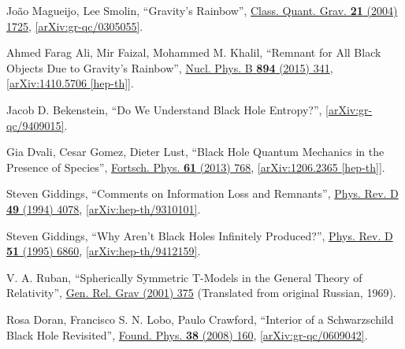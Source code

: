 \documentclass[12pt,preprintnumbers, floatfix, preprintnumbers, letterpaper, superscriptaddress,nofootinbib]{revtex4-2}
\begin{document}
\begin{thebibliography}{99}
Jo\~{a}o Magueijo, Lee Smolin, ``Gravity's Rainbow'', {\hypersetup{urlcolor=vividviolet}\href{https://iopscience.iop.org/article/10.1088/0264-9381/21/7/001}{Class. Quant. Grav. \textbf{21} (2004) 1725}}, \href{https://arxiv.org/abs/gr-qc/0305055}{[arXiv:gr-qc/0305055]}.

Ahmed Farag Ali, Mir Faizal, Mohammed M. Khalil, ``Remnant for All Black Objects Due to Gravity's Rainbow'', {\hypersetup{urlcolor=vividviolet}\href{https://www.sciencedirect.com/science/article/pii/S0550321315000966?via\%3Dihub}{Nucl. Phys. B \textbf{894} (2015) 341}}, \href{https://arxiv.org/abs/1410.5706}{[arXiv:1410.5706 [hep-th]]}.


Jacob D. Bekenstein, ``Do We Understand Black Hole Entropy?'', \href{https://arxiv.org/abs/gr-qc/9409015}{[arXiv:gr-qc/9409015]}.

Gia Dvali, Cesar Gomez, Dieter Lust, ``Black Hole Quantum Mechanics in the Presence of Species'', {\hypersetup{urlcolor=vividviolet}\href{https://onlinelibrary.wiley.com/doi/10.1002/prop.201300002}{Fortsch. Phys. \textbf{61} (2013) 768}}, \href{https://arxiv.org/abs/1206.2365}{[arXiv:1206.2365 [hep-th]]}.

Steven Giddings, ``Comments on Information Loss and Remnants'', {\hypersetup{urlcolor=vividviolet}\href{https://journals.aps.org/prd/abstract/10.1103/PhysRevD.49.4078}{Phys. Rev. D \textbf{49} (1994) 4078}}, \href{https://arxiv.org/abs/hep-th/9310101}{[arXiv:hep-th/9310101]}.

Steven Giddings, ``Why Aren't Black Holes Infinitely Produced?'', {\hypersetup{urlcolor=vividviolet}\href{https://journals.aps.org/prd/abstract/10.1103/PhysRevD.51.6860}{Phys. Rev. D \textbf{51} (1995) 6860}}, \href{https://arxiv.org/abs/hep-th/9412159}{[arXiv:hep-th/9412159]}.

V. A. Ruban, ``Spherically Symmetric T-Models in the General Theory of Relativity'', {\hypersetup{urlcolor=vividviolet}\href{https://link.springer.com/article/10.1023/A:1002779702615}{Gen. Rel. Grav  (2001) 375}} (Translated from original Russian, 1969).

Rosa Doran, Francisco S. N. Lobo, Paulo Crawford, ``Interior of a Schwarzschild Black Hole Revisited'', {\hypersetup{urlcolor=vividviolet}\href{https://link.springer.com/article/10.1007/s10701-007-9197-6}{Found. Phys. \textbf{38} (2008) 160}}, \href{https://arxiv.org/abs/gr-qc/0609042}{[arXiv:gr-qc/0609042]}.


\end{thebibliography}
\end{document}
